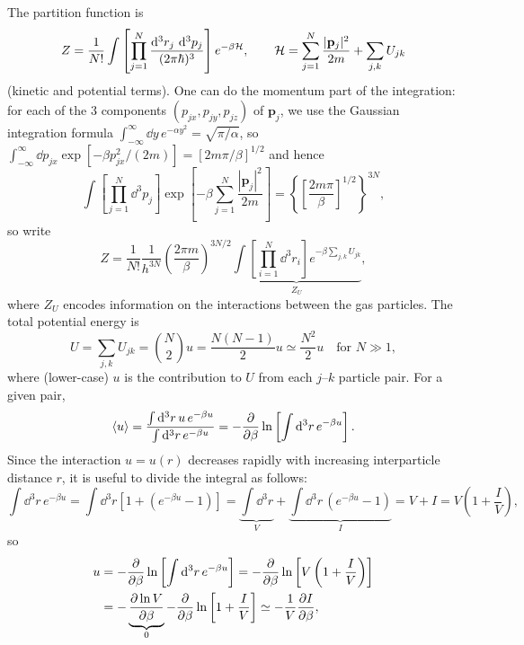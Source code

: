 The partition function is
\begin{equation}
  Z = \frac{1}{N!}\int\left[\prod_{j=1}^N\frac{\mathop{}\!\mathrm{d}^3r_j\,\mathop{}\!\mathrm{d}^3p_j}{(2\pi\hbar)^3}\right]e^{-\beta\mathcal{H}},\qquad
  \mathcal{H} = \sum_{j=1}^N\frac{|\mathbf p_j|^2}{2m} + \sum_{j,k}U_{jk}
\end{equation}
(kinetic and potential terms). One can do the momentum part of the integration: for each of the 3 components
$(p_{jx},p_{jy},p_{jz})$ of $\mathbf p_j$, we use the Gaussian integration formula
$\int_{-\infty}^\infty\dd y\,e^{-\alpha y^2} = \sqrt{\pi/\alpha}$, so
$\int_{-\infty}^\infty\dd p_{jx}\exp\left[-\beta p_{jx}^2/(2m)\right] = \left[2m\pi/\beta\right]^{1/2}$ and hence
\begin{equation}
  \int\left[\prod_{j=1}^N\dd^3p_j\right]\exp\left[-\beta\sum_{j=1}^N\frac{|\mathbf p_j|^2}{2m}\right]
  = \left\{\left[\frac{2m\pi}{\beta}\right]^{1/2}\right\}^{3N},
\end{equation}
so write
\begin{equation}
  Z = \frac{1}{N!}\frac{1}{h^{3N}}\left(\frac{2\pi m}{\beta}\right)^{3N/2}
      \underbrace{\int\left[\prod_{i=1}^N\dd^3r_i\right]e^{-\beta\sum_{j,k}U_{jk}}}_{Z_U},
\end{equation}
where $Z_U$ encodes information on the interactions between the gas particles. The total potential energy is
\begin{equation}
  U = \sum_{j,k}U_{jk} = \binom N2u = \frac{N(N-1)}{2}u\simeq\frac{N^2}{2}u\quad\text{for } N\gg 1,
\end{equation}
where (lower-case) $u$ is the contribution to $U$ from each $j$--$k$ particle pair. For a given pair,
\begin{equation}
  \langle u\rangle = \frac{\int\mathop{}\!\mathrm{d}^3r\,u\,e^{-\beta u}}{\int\mathop{}\!\mathrm{d}^3r\,e^{-\beta u}} = -\frac{\partial }{\partial \beta}\ln\left[\int\mathop{}\!\mathrm{d}^3r\,e^{-\beta u}\right].
\end{equation}
Since the interaction $u = u(r)$ decreases rapidly with increasing interparticle distance $r$, it is useful to
divide the integral as follows:
\begin{equation}
  \int\dd^3r\,e^{-\beta u} = \int\dd^3r\left[1 + (e^{-\beta u}-1)\right]
  = \underbrace{\int\dd^3r}_{V} + \underbrace{\int\dd^3r\,(e^{-\beta u}-1)}_{I}
  = V + I = V\left(1+\frac{I}{V}\right),
\end{equation}
so
\begin{align}
  u &= -\frac{\partial }{\partial \beta}\ln\left[\int\mathop{}\!\mathrm{d}^3r\,e^{-\beta u}\right] = -\frac{\partial }{\partial \beta}\ln\left[V\left(1+\frac{I}{V}\right)\right]\nonumber\\
    &= -\underbrace{\frac{\partial \ln V}{\partial \beta}}_{0} - \frac{\partial }{\partial \beta}\ln\left[1+\frac{I}{V}\right]\simeq-\frac{1}{V}\frac{\partial I}{\partial \beta},
\end{align}

